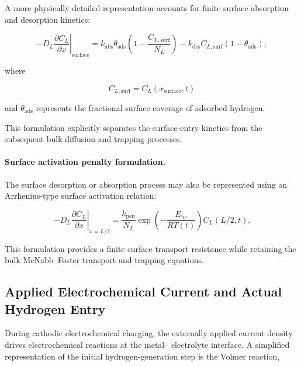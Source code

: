 A more physically detailed representation accounts for finite surface
absorption and desorption kinetics:

\begin{equation}
-D_L
\left.
\frac{\partial C_L}{\partial x}
\right|_{\mathrm{surface}}
=
k_{\mathrm{abs}}\theta_{\mathrm{ads}}
\left(
1-\frac{C_{L,\mathrm{surf}}}{N_L}
\right)
-
k_{\mathrm{des}}C_{L,\mathrm{surf}}
\left(
1-\theta_{\mathrm{ads}}
\right),
\label{eq:ch3_robin_BC}
\end{equation}

where

\begin{equation}
C_{L,\mathrm{surf}}
=
C_L(x_{\mathrm{surface}},t)
\end{equation}

and $\theta_{\mathrm{ads}}$ represents the fractional surface
coverage of adsorbed hydrogen.

This formulation explicitly separates the surface-entry kinetics from
the subsequent bulk diffusion and trapping processes.

\paragraph{Surface activation penalty formulation.}

The surface desorption or absorption process may also be represented
using an Arrhenius-type surface activation relation:

\begin{equation}
-D_L
\left.
\frac{\partial C_L}{\partial x}
\right|_{x=L/2}
=
\frac{k_{\mathrm{pen}}}{N_L}
\exp\left(
-\frac{E_{\mathrm{bc}}}{RT(t)}
\right)
C_L(L/2,t).
\label{eq:ch3_penalty_BC}
\end{equation}

This formulation provides a finite surface transport resistance while
retaining the bulk McNabb--Foster transport and trapping equations.

\subsection{Applied Electrochemical Current and Actual Hydrogen Entry}
\label{subsec:electrochemical_entry}

During cathodic electrochemical charging, the externally applied
current density drives electrochemical reactions at the metal--
electrolyte interface. A simplified representation of the initial
hydrogen-generation step is the Volmer reaction,

